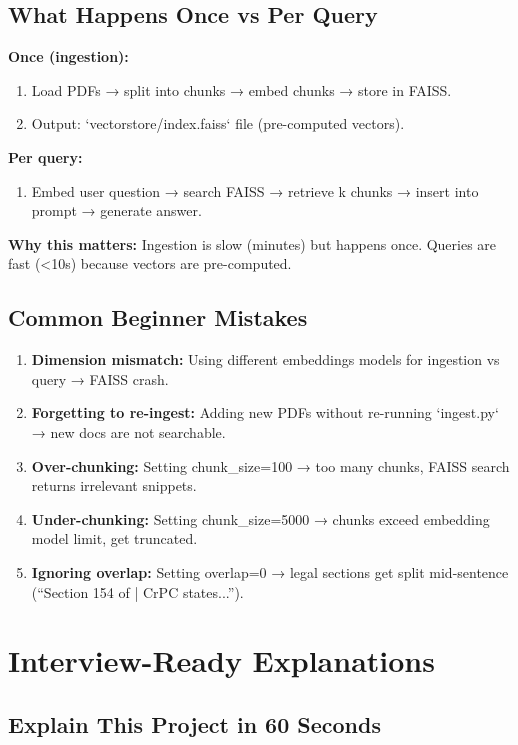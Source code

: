 \documentclass[11pt,a4paper]{article}
\begin{document}
\subsection{What Happens Once vs Per Query}

\textbf{Once (ingestion):}
\begin{enumerate}
\item Load PDFs → split into chunks → embed chunks → store in FAISS.
\item Output: `vectorstore/index.faiss` file (pre-computed vectors).
\end{enumerate}

\textbf{Per query:}
\begin{enumerate}
\item Embed user question → search FAISS → retrieve k chunks → insert into prompt → generate answer.
\end{enumerate}

\textbf{Why this matters:} Ingestion is slow (minutes) but happens once. Queries are fast (<10s) because vectors are pre-computed.

\subsection{Common Beginner Mistakes}

\begin{enumerate}
\item \textbf{Dimension mismatch:} Using different embeddings models for ingestion vs query → FAISS crash.
\item \textbf{Forgetting to re-ingest:} Adding new PDFs without re-running `ingest.py` → new docs are not searchable.
\item \textbf{Over-chunking:} Setting chunk\_size=100 → too many chunks, FAISS search returns irrelevant snippets.
\item \textbf{Under-chunking:} Setting chunk\_size=5000 → chunks exceed embedding model limit, get truncated.
\item \textbf{Ignoring overlap:} Setting overlap=0 → legal sections get split mid-sentence (``Section 154 of | CrPC states...'').
\end{enumerate}

\section{Interview-Ready Explanations}

\subsection{Explain This Project in 60 Seconds}
\end{document}
